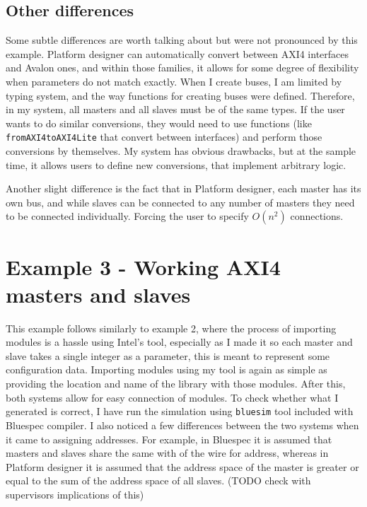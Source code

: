 \documentclass[12pt]{report}
\begin{document}
\subsection{Other differences} 
Some subtle differences are worth talking about but were not pronounced by this example. 
Platform designer can automatically convert between AXI4 interfaces and Avalon ones, and within those families, it allows for some degree of flexibility when parameters do not match exactly. 
When I create buses, I am limited by typing system, and the way functions for creating buses were defined. Therefore, in my system, all masters and all slaves must be of the same types. If the user wants to do similar conversions, they would need to use functions (like \verb!fromAXI4toAXI4Lite! that convert between interfaces) and perform those conversions by themselves. My system has obvious drawbacks, but at the sample time, it allows users to define new conversions, that implement arbitrary logic. 
\par 
Another slight difference is the fact that in Platform designer, each master has its own bus, and while slaves can be connected to any number of masters they need to be connected individually. Forcing the user to specify $O(n^2)$ connections. 
\section{Example 3 - Working AXI4 masters and slaves} 
This example follows similarly to example 2, where the process of importing modules is a hassle using Intel's tool, especially as I made it so each master and slave takes a single integer as a parameter, this is meant to represent some configuration data. Importing modules using my tool is again as simple as providing the location and name of the library with those modules. After this, both systems allow for easy connection of modules. To check whether what I generated is correct, I have run the simulation using \verb!bluesim! tool included with Bluespec compiler. I also noticed a few differences between the two systems when it came to assigning addresses. For example, in Bluespec it is assumed that masters and slaves share the same with of the wire for address, whereas in Platform designer it is assumed that the address space of the master is greater or equal to the sum of the address space of all slaves. (TODO check with supervisors implications of this) 
 
\end{document}
